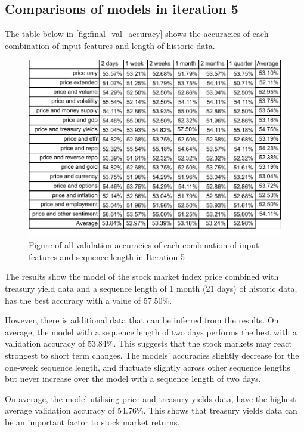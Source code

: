 \subsection{Comparisons of models in iteration 5}\label{ssec:iteration5_best_val_acc}
The table below in \autoref{fig:final_val_accuracy} shows the accuracies of each combination of input features and length of historic data.
\begin{figure}[ht]
    \centering
    \includegraphics[width=0.95\columnwidth]{figures/results/final/final_val_accuracy.pdf}
    \caption[Best validation accuracies for Iteration 5]{Figure of all validation accuracies of each combination of input features and sequence length in Iteration 5}
    \label{fig:final_val_accuracy}
\end{figure}
\FloatBarrier

The results show the model of the stock market index price combined with treasury yield data and 
a sequence length of 1 month (21 days) of historic data, has the best accuracy with a value of
57.50\%.

However, there is additional data that can be inferred from the results. On average, the model with a sequence
length of two days performs the best with a validation accuracy of 53.84\%. This suggests that the stock markets may react
strongest to short term changes. The models' accuracies slightly decrease for the one-week sequence length, and fluctuate
slightly across other sequence lengths but never increase over the model with a sequence length of two days.

On average, the model utilising price and treasury yields data, have the highest average validation accuracy of 54.76\%. This
shows that treasury yields data can be an important factor to stock market returns.

